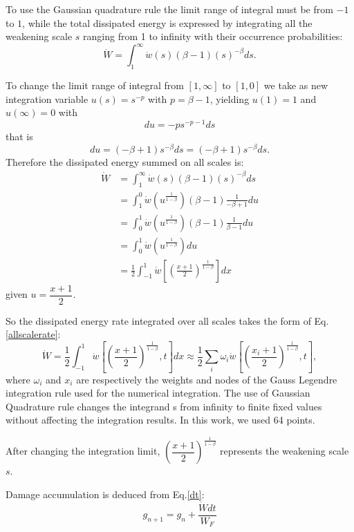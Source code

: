 \documentclass[3p,times,number,review]{elsarticle}
\begin{document}
To use the Gaussian quadrature rule the limit range of integral must be from $-1$ to $1$, while the total dissipated energy  is expressed by integrating all the weakening scale $s$ ranging from 1 to infinity with their occurrence probabilities:
$$\dot{W}=\int_{1}^{\infty}\dot{w}(s) (\beta-1)(s)^{-\beta}ds.$$

\noindent
To change the limit range of integral from $[1,\infty]$ to $[1,0]$ we take as new integration variable
$u(s)= s^{-p}$ with $p=\beta-1$, yielding $u(1)=1$ and  $u(\infty)=0$ with
$$du=-ps^{-p-1}ds$$ 
that is
$$du=(-\beta+1) s^{-\beta}ds=(-\beta+1)s^{-\beta} ds.$$
Therefore the dissipated energy summed on all scales is:
\begin{equation}
\begin{split}
\dot{W}&=\int_{1}^{\infty}\dot{w}(s) (\beta-1)(s)^{-\beta}ds
\\&=\int_{1}^{0}\dot{w}\left( u^{\frac{1}{1-\beta}}\right) (\beta-1) \frac{1}{-\beta+1}du
\\&=\int_{0}^{1}\dot{w}\left( u^{\frac{1}{1-\beta}}\right) (\beta-1) \frac{1}{\beta-1}du
\\&=\int_{0}^{1}\dot{w}\left( u^{\frac{1}{1-\beta}}\right)du
\\&=\frac{1}{2}\int_{-1}^{1}\dot{w}\left[  \left( \frac{x+1}{2}\right) ^{\frac{1}{1-\beta}}\right] dx
\end{split}
\label{allscale}
\end{equation}
given $u=\dfrac{x+1}{2}$.

So the dissipated energy rate integrated over all scales takes the form of Eq.\eqref{allscalerate}:
\begin{equation}
\dot{W}=\frac{1}{2}\int_{-1}^{1}\dot{w}\left[  \left( \frac{x+1}{2}\right) ^{\frac{1}{1-\beta}},t\right] dx\approx\frac{1}{2}\sum_{i}\omega_i\dot{w}\left[  \left( \frac{x_i+1}{2}\right) ^{\frac{1}{1-\beta}},t\right],
\label{allscalerate}
\end{equation}
where $\omega_i$ and $x_i$ are respectively the weights and nodes of the Gauss Legendre integration rule used for the numerical integration. The use of Gaussian Quadrature rule changes the integrand s from infinity to finite fixed values without affecting the integration results. In this work, we used 64 points\cite{legendre}.

After changing the integration limit, $\left( \dfrac{x+1}{2}\right) ^{\frac{1}{1-\beta}}$ represents the weakening scale $s$. 

Damage accumulation is deduced from Eq.\eqref{dt}:
\begin{equation}
g_{n+1}=g_n+\dfrac{\dot{W}dt}{W_F}
\label{damage}
\end{equation}
\end{document}
